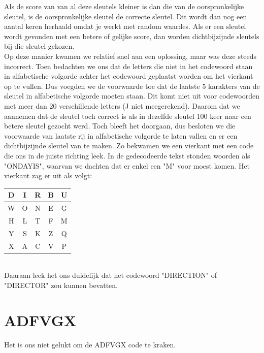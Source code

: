 \documentclass[fleqn]{article}
\begin{document}
	Als de score van van al deze sleutels kleiner is dan die van de oorspronkelijke sleutel, is de oorspronkelijke sleutel de correcte sleutel. Dit wordt dan nog een aantal keren herhaald omdat je werkt met random waardes. Als er een sleutel wordt gevonden met een betere of gelijke score, dan worden dichtbijzijnde sleutels bij die sleutel gekozen.\\
	Op deze manier kwamen we relatief snel aan een oplossing, maar was deze steeds incorrect. Toen bedachten we ons dat de letters die niet in het codewoord staan in alfabetische volgorde achter het codewoord geplaatst worden om het vierkant op te vullen. Dus voegden we de voorwaarde toe dat de laatste 5 karakters van de sleutel in alfabetische volgorde moeten staan. Dit komt niet uit voor codewoorden met meer dan 20 verschillende letters (J niet meegerekend). Daarom dat we aannemen dat de sleutel toch correct is als in dezelfde sleutel 100 keer naar een betere sleutel gezocht werd. Toch bleeft het doorgaan, dus besloten we die voorwaarde van laatste rij in alfabetische volgorde te laten vallen en er een dichtbijzijnde sleutel van te maken. Zo bekwamen we een vierkant met een code die ons in de juiste richting leek. In de gedecodeerde tekst stonden woorden als "ONDAYIS", waarvan we dachten dat er enkel een "M" voor moest komen. Het vierkant zag er uit als volgt:
	\\
	\begin{tabular}{|c|c|c|c|c|}
		\hline 
		D & I & R & B & U \\ 
		\hline 
		W & O & N & E & G \\ 
		\hline 
		H & L & T & F & M \\ 
		\hline 
		Y & S & K & Z & Q \\ 
		\hline 
		X & A & C & V & P \\ 
		\hline 
	\end{tabular} 
	\\
	Daaraan leek het ons duidelijk dat het codewoord "DIRECTION" of "DIRECTOR" zou kunnen bevatten.
	\section{ADFVGX}
	Het is ons niet gelukt om de ADFVGX code te kraken.\\
\end{document}
